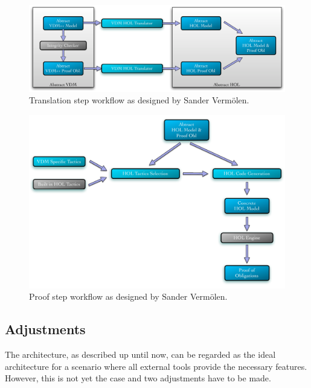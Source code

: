 \documentclass[]{article}
\begin{document}
\begin{figure}
  \begin{center}
  \includegraphics[width=\textwidth]{images/pic_translation.pdf}
  \caption[Translation workflow]{Translation step workflow as designed by Sander Verm\"olen.}
  \label{fig:arch_translation}
  \end{center}
\end{figure}

\begin{figure}
  \begin{center}
  \includegraphics[width=\textwidth]{images/pic_proof.pdf}
  \caption[Proof workflow]{Proof step workflow as designed by Sander Verm\"olen.}
  \label{fig:arch_proof}
  \end{center}
\end{figure}


\subsection{Adjustments}
\label{sub:adjustments}

The architecture, as described up until now, can be regarded as the ideal architecture for a scenario where all external tools provide the necessary features.
However, this is not yet the case and two adjustments have to be made.
\end{document}
